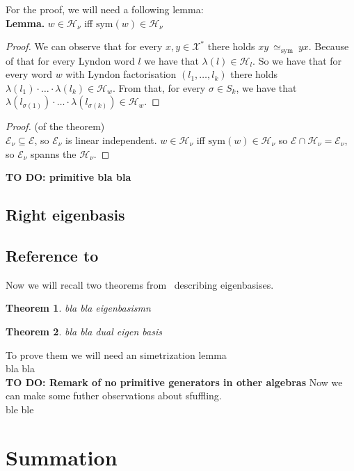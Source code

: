 \documentclass[a4paper, 12pt]{report}
\newtheorem{theorem}{Theorem}
\newcommand{\todo}[1]{\hfill \break \textbf{\Huge TO DO: #1 \hfill \break}\normalsize}
\newcommand{\SimeqSym}{{\simeq_\mathrm{sym}}}
\begin{document}
For the proof, we will need a following lemma: \\
\noindent \textbf{Lemma.} $w \in \mathcal{H}_\nu$ iff $\mathrm{sym}(w) \in \mathcal{H}_\nu$
\begin{proof}
We can observe that for every $x, y \in \mathcal{X}^*$ there holds $xy\ \SimeqSym\ yx$. Because of that 
for every Lyndon word $l$ we have that $\lambda(l) \in \mathcal{H}_l$. So we have that for every word $w$ 
with Lyndon factorisation $(l_1,\dots, l_k)$ there holds 
$\lambda(l_1)\cdot\ldots\cdot\lambda(l_k) \in \mathcal{H}_w$. From that, for every 
$\sigma \in S_k$, we have that $\lambda(l_{\sigma(1)})\cdot\ldots\cdot\lambda(l_{\sigma(k)}) \in 
\mathcal{H}_w$.

\end{proof}
\begin{proof}(of the theorem) \\ 
$\mathcal{E}_\nu \subseteq\mathcal{E}$, 
so $\mathcal{E}_\nu$ is linear independent. $w \in \mathcal{H}_\nu$ iff 
$\mathrm{sym}(w) \in \mathcal{H}_\nu$ so $\mathcal{E} \cap \mathcal{H}_\nu = \mathcal{E}_\nu$, so 
$\mathcal{E}_\nu$ spanns the $\mathcal{H}_\nu$.
\end{proof}


\todo{primitive bla bla}
\section{Right eigenbasis}

\section{Reference to~\cite{Diaconis2014}}
Now we will recall two theorems from~\cite{Diaconis2014} describing eigenbasises.
\begin{theorem}
bla bla eigenbasismn   
\end{theorem}
\begin{theorem}
bla bla dual eigen basis
\end{theorem}
To prove them we will need an simetrization lemma \\
bla bla\\[8pt]
\todo{Remark of no primitive generators in other algebras}
Now we can make some futher observations about sfuffling.\\
ble ble\\

\chapter{Summation}


{}

\end{document}
